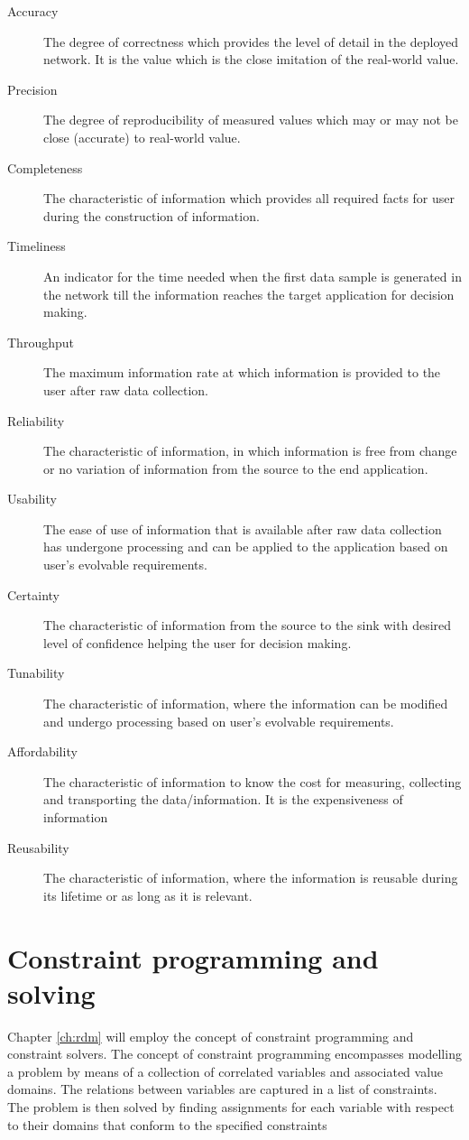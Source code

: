 \begin{description}
\nospace
\item[Accuracy] The degree of correctness which provides the level of detail in the deployed network. It is the value which is the close imitation of the real-world value.
\item[Precision] The degree of reproducibility of measured values which may or may not be close (accurate) to real-world value.
\item[Completeness] The characteristic of information which provides all required facts for user during the construction of information.
\item[Timeliness] An indicator for the time needed when the first data sample is generated in the network till the information reaches the target application for decision making.
\item[Throughput] The maximum information rate at which information is provided to the user after raw data collection.
\item[Reliability] The characteristic of information, in which information is free from change or no variation of information from the source to the end application.
\item[Usability] The ease of use of information that is available after raw data collection has undergone processing and can be applied to the application based on user's evolvable requirements.
\item[Certainty] The characteristic of information from the source to the sink with desired level of confidence helping the user for decision making.
\item[Tunability] The characteristic of information, where the information can be modified and undergo processing based on user's evolvable requirements.
\item[Affordability] The characteristic of information to know the cost for measuring, collecting and transporting the data/information. It is the expensiveness of information
\item[Reusability] The characteristic of information, where the information is reusable during its lifetime or as long as it is relevant.
\end{description}
\section{Constraint programming and solving}
\label{sec:back:constraint}
Chapter \ref{ch:rdm} will employ the concept of constraint programming and constraint solvers. The concept of constraint programming encompasses modelling a problem by means of a collection of correlated variables and associated value domains. The relations between variables are captured in a list of constraints. The problem is then solved by finding assignments for each variable with respect to their domains that conform to the specified constraints

